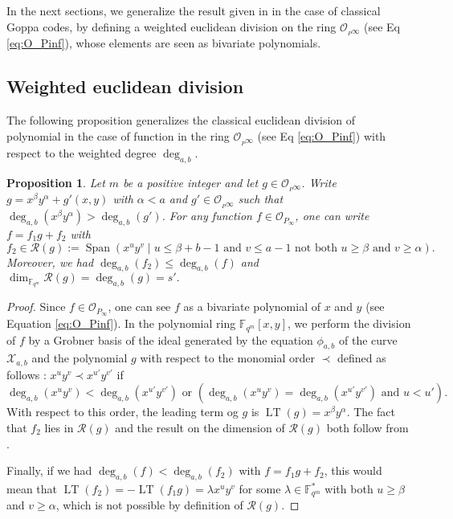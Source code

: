 \documentclass[a4paper]{article}
\newtheorem{proposition}[thm]{Proposition}
\theoremstyle{definition}
\theoremstyle{remark}
\newcommand{\calO}{\mathcal{O}}
\newcommand{\calR}{\mathcal{R}}
\newcommand{\calX}{\mathcal{X}}
\newcommand{\fqm}{\mathbb{F}_{q^m}}
\newcommand{\F}{\mathbb{F}}
\newcommand{\Span}[1]{\operatorname{Span}\left(#1\right)}
\newcommand{\LT}[1]{\operatorname{LT}\left(#1\right)}
\newcommand{\degab}[1]{\deg_{a,b}\left(#1\right)}
\begin{document}
\noindent In the next sections, we generalize the result given in \cite{MT21} in the case of classical Goppa codes, by defining a weighted euclidean division on the ring $\calO_{_P\infty}$ (see Eq \eqref{eq:O_Pinf}), whose elements are seen as bivariate polynomials. 

\subsection{Weighted euclidean division}

\noindent The following proposition generalizes the classical euclidean division of polynomial in the case of function in the ring $\calO_{_P\infty}$ (see Eq \eqref{eq:O_Pinf}) with respect to the weighted degree $\deg_{a,b}$.


\begin{proposition}\label{prop:div_grob}
Let $m$ be a positive integer and let $g \in \calO_{_P\infty}$. Write $g=x^\beta y^\alpha +g'(x,y)$ with $\alpha < a$ and $g' \in \calO_{_P\infty}$ such that $\degab{x^\beta y^\alpha}>\degab{g'}$.
For any function $f \in \calO_{P_\infty}$, one can write $f=f_1g+f_2$ with 
\[f_2 \in \calR(g):= \Span{x^u y^v \mid u \leq \beta + b-1 \text{ and } v\leq a-1 \text{ not both }  u \geq \beta \text{ and } v \geq \alpha}.\]
Moreover, we had $\degab{f_2} \leq \degab{f}$ and $\dim_{\fqm} \calR(g) = \degab{g}=s'.$ 
\end{proposition}

\begin{proof}
		Since $f \in \calO_{P_\infty}$, one can see $f$ as a bivariate polynomial of $x$ and $y$ (see Equation \ref{eq:O_Pinf}). In the polynomial ring $\F_{q^m}[x,y]$, we perform the division of $f$ by a Grobner basis of the ideal generated by the equation $\phi_{a,b}$ of the curve $\calX_{a,b}$ and the polynomial $g$ with respect to the monomial order $\prec$ defined as follows : $x^uy^v \prec x^{u'}y^{v'}$ if
	\[ \degab{x^uy^v} < \degab{x^{u'}y^{v'}} \text{ or } \left(\degab{x^uy^v} = \degab{x^{u'}y^{v'}}  \text{ and } u < u'\right).\]
	With respect to this order, the leading term og $g$ is $\LT{g}=x^\beta y^\alpha$. The fact that $f_2$ lies in $\calR(g)$ and the result on the dimension of $\calR(g)$ both follow from \cite[Proposition 4]{GH00}.
	
	Finally, if we had $\degab{f} < \degab{f_2}$ with $f=f_1 g +f_2$, this would mean that $\LT{f_2}=-\LT{f_1 g}=\lambda x^uy^v$ for some $\lambda \in \F_{q^m}^*$ with both $u \geq \beta$ and $v \geq \alpha$, which is not possible by definition of $\calR\left(g\right)$.
\end{proof}
\end{document}
